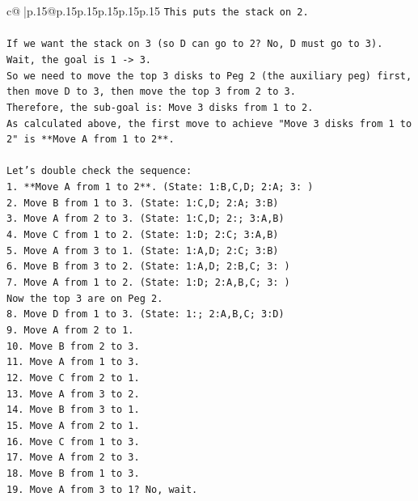 \documentclass{article}
\begin{document}
{\begin{supertabular}{c@{$\;$}|p{.15\linewidth}@{}p{.15\linewidth}p{.15\linewidth}p{.15\linewidth}p{.15\linewidth}p{.15\linewidth}}
{{{\texttt{This puts the stack on 2.} \\
\\ 
\texttt{If we want the stack on 3 (so D can go to 2? No, D must go to 3).} \\
\texttt{Wait, the goal is 1 {-}> 3.} \\
\texttt{So we need to move the top 3 disks to Peg 2 (the auxiliary peg) first, then move D to 3, then move the top 3 from 2 to 3.} \\
\texttt{Therefore, the sub{-}goal is: Move 3 disks from 1 to 2.} \\
\texttt{As calculated above, the first move to achieve "Move 3 disks from 1 to 2" is **Move A from 1 to 2**.} \\
\\ 
\texttt{Let's double check the sequence:} \\
\texttt{1. **Move A from 1 to 2**. (State: 1:B,C,D; 2:A; 3: )} \\
\texttt{2. Move B from 1 to 3. (State: 1:C,D; 2:A; 3:B)} \\
\texttt{3. Move A from 2 to 3. (State: 1:C,D; 2:; 3:A,B)} \\
\texttt{4. Move C from 1 to 2. (State: 1:D; 2:C; 3:A,B)} \\
\texttt{5. Move A from 3 to 1. (State: 1:A,D; 2:C; 3:B)} \\
\texttt{6. Move B from 3 to 2. (State: 1:A,D; 2:B,C; 3: )} \\
\texttt{7. Move A from 1 to 2. (State: 1:D; 2:A,B,C; 3: )} \\
\texttt{Now the top 3 are on Peg 2.} \\
\texttt{8. Move D from 1 to 3. (State: 1:; 2:A,B,C; 3:D)} \\
\texttt{9. Move A from 2 to 1.} \\
\texttt{10. Move B from 2 to 3.} \\
\texttt{11. Move A from 1 to 3.} \\
\texttt{12. Move C from 2 to 1.} \\
\texttt{13. Move A from 3 to 2.} \\
\texttt{14. Move B from 3 to 1.} \\
\texttt{15. Move A from 2 to 1.} \\
\texttt{16. Move C from 1 to 3.} \\
\texttt{17. Move A from 2 to 3.} \\
\texttt{18. Move B from 1 to 3.} \\
\texttt{19. Move A from 3 to 1? No, wait.} \\
}}}
\end{supertabular}}
\end{document}

